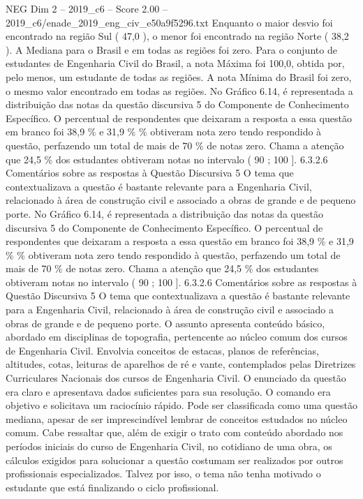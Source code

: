 \begin{textsample}{NEG Dim 2 – 2019\_c6 – Score 2.00 – 2019\_c6/enade\_2019\_eng\_civ\_e50a9f5296.txt}
Enquanto o maior desvio foi encontrado na região Sul ( 47,0 ), o menor foi encontrado na região Norte ( 38,2 ).
A Mediana para o Brasil e em todas as regiões foi zero.
Para o conjunto de estudantes de Engenharia Civil do Brasil, a nota Máxima foi 100,0, obtida por, pelo menos, um estudante de todas as regiões.
A nota Mínima do Brasil foi zero, o mesmo valor encontrado em todas as regiões.
No Gráfico 6.14, é representada a distribuição das notas da questão discursiva 5 do Componente de Conhecimento Específico.
O percentual de respondentes que deixaram a resposta a essa questão em branco foi 38,9 \% e 31,9 \% \% obtiveram nota zero tendo respondido à questão, perfazendo um total de mais de 70 \% de notas zero.
Chama a atenção que 24,5 \% dos estudantes obtiveram notas no intervalo ( 90 ; 100 ]. 6.3.2.6 Comentários sobre as respostas à Questão Discursiva 5 O tema que contextualizava a questão é bastante relevante para a Engenharia Civil, relacionado à área de construção civil e associado a obras de grande e de pequeno porte.
No Gráfico 6.14, é representada a distribuição das notas da questão discursiva 5 do Componente de Conhecimento Específico.
O percentual de respondentes que deixaram a resposta a essa questão em branco foi 38,9 \% e 31,9 \% \% obtiveram nota zero tendo respondido à questão, perfazendo um total de mais de 70 \% de notas zero.
Chama a atenção que 24,5 \% dos estudantes obtiveram notas no intervalo ( 90 ; 100 ]. 6.3.2.6 Comentários sobre as respostas à Questão Discursiva 5 O tema que contextualizava a questão é bastante relevante para a Engenharia Civil, relacionado à área de construção civil e associado a obras de grande e de pequeno porte.
O assunto apresenta conteúdo básico, abordado em disciplinas de topografia, pertencente ao núcleo comum dos cursos de Engenharia Civil.
Envolvia conceitos de estacas, planos de referências, altitudes, cotas, leituras de aparelhos de ré e vante, contemplados pelas Diretrizes Curriculares Nacionais dos cursos de Engenharia Civil.
O enunciado da questão era claro e apresentava dados suficientes para sua resolução.
O comando era objetivo e solicitava um raciocínio rápido.
Pode ser classificada como uma questão mediana, apesar de ser imprescindível lembrar de conceitos estudados no núcleo comum.
Cabe ressaltar que, além de exigir o trato com conteúdo abordado nos períodos iniciais do curso de Engenharia Civil, no cotidiano de uma obra, os cálculos exigidos para solucionar a questão costumam ser realizados por outros profissionais especializados.
Talvez por isso, o tema não tenha motivado o estudante que está finalizando o ciclo profissional.

\end{textsample}
